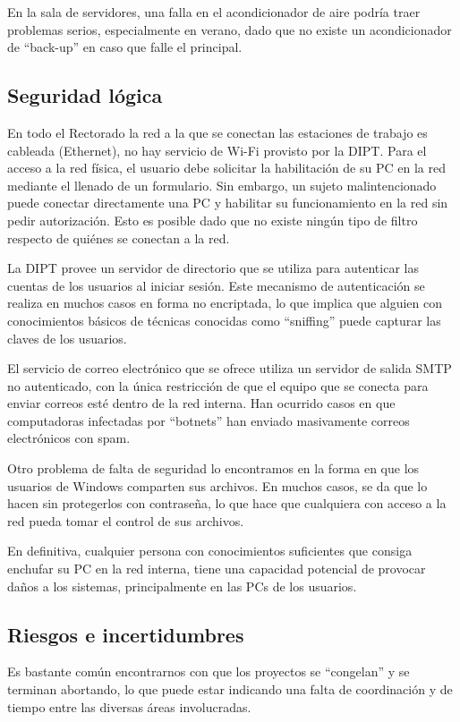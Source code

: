 \documentclass[a4paper,11pt,oneside]{article}
\begin{document}

En la sala de servidores, una falla en el acondicionador de aire
podría traer problemas serios, especialmente en verano, dado que no
existe un acondicionador de ``back-up'' en caso que falle el
principal.


%
\subsection*{Seguridad lógica}
En todo el Rectorado la red a la que se conectan las estaciones de
trabajo es cableada (Ethernet), no hay servicio de Wi-Fi provisto por
la DIPT. Para el acceso a la red física, el usuario debe solicitar la
habilitación de su PC en la red mediante el llenado de un
formulario. Sin embargo, un sujeto malintencionado puede conectar
directamente una PC y habilitar su funcionamiento en la red sin pedir
autorización. Esto es posible dado que no existe ningún tipo de filtro
respecto de quiénes se conectan a la red.

La DIPT provee un servidor de directorio  que se utiliza
para autenticar las cuentas de los usuarios al iniciar sesión. Este
mecanismo de autenticación se realiza en muchos casos en forma no
encriptada, lo que implica que alguien con conocimientos básicos de
técnicas conocidas como ``sniffing'' puede capturar las claves de los
usuarios.

El servicio de correo electrónico que se ofrece utiliza un servidor de
salida SMTP no autenticado, con la única restricción de que el equipo
que se conecta para enviar correos esté dentro de la red interna. Han
ocurrido casos en que computadoras infectadas por ``botnets'' han
enviado masivamente correos electrónicos con spam.

Otro problema de falta de seguridad lo encontramos en la forma en que
los usuarios de Windows comparten sus archivos. En muchos casos, se da
que lo hacen sin protegerlos con contraseña, lo que hace que
cualquiera con acceso a la red pueda tomar el control de sus archivos.

En definitiva, cualquier persona con conocimientos suficientes que
consiga enchufar su PC en la red interna, tiene una capacidad
potencial de provocar daños a los sistemas, principalmente en las PCs
de los usuarios.
%
\subsection*{Riesgos e incertidumbres}
%
Es bastante común encontrarnos con que los proyectos se ``congelan'' y
se terminan abortando, lo que puede estar indicando una falta de
coordinación y de tiempo entre las diversas áreas involucradas.
\end{document}
